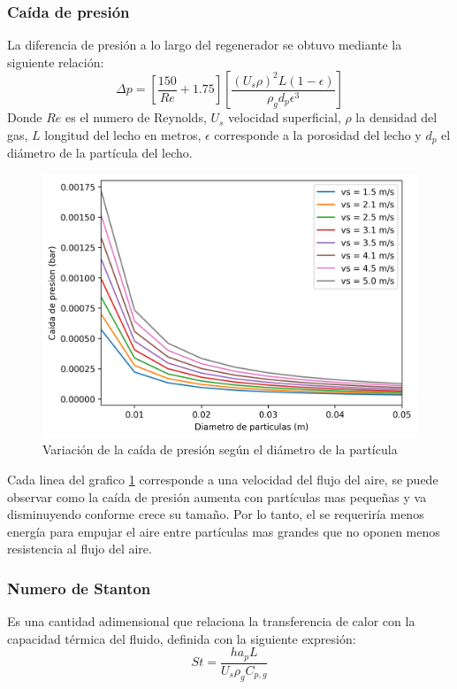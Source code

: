 \documentclass[12pt,letterpaper,final]{article}%
\begin{document}
\subsubsection{Caída de presión}
La diferencia de presión a lo largo del regenerador se obtuvo mediante la siguiente relación\cite{Valle-Guadarrama2015}:
\begin{equation}\label{Ecu_ergun}
	\Delta p = [ \frac{150}{Re} + 1.75 ] [ \frac{(U_s \rho)^2 L (1-\epsilon)}{\rho_g d_p \epsilon^3}  ]
\end{equation}
Donde $Re$ es el numero de Reynolds, $U_s$ velocidad superficial, $\rho$ la densidad del gas, $L$ longitud del lecho en metros, $\epsilon$ corresponde a la porosidad del lecho y $d_p$ el diámetro de la partícula del lecho.
\begin{figure}[ht!]
	\centering
	\includegraphics[scale=0.9]{dPrvsDp_03.png}
	\caption{Variación de la caída de presión según el diámetro de la partícula}
	\label{fig:CaidaP_por_dp}
\end{figure}
Cada linea del grafico \ref{fig:CaidaP_por_dp} corresponde a una velocidad del flujo del aire, se puede observar como la caída de presión aumenta con partículas mas pequeñas y va disminuyendo conforme crece su tamaño. Por lo tanto, el se requeriría menos energía para empujar el aire entre partículas mas grandes que no oponen menos resistencia al flujo del aire. 
\subsubsection{Numero de Stanton}
Es una cantidad adimensional que relaciona la transferencia de calor con la capacidad térmica del fluido, definida con la siguiente expresión\cite{Ramachadran1984}:
\begin{equation}\label{Ecu_stanton}
	St = \frac{h a_p L}{U_s \rho_g C_{p,g}}
\end{equation}
\end{document}
